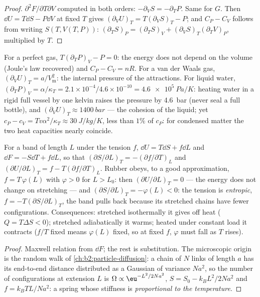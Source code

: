 \begin{proof}
$\partial^2F/\partial T\partial V$ computed in both orders: $-\partial_VS =
-\partial_TP$. Same for $G$. Then $\dd U = T\dd S - P\dd V$ at fixed $T$
gives $(\partial_VU)_T = T(\partial_VS)_T - P$; and $C_P - C_V$ follows
from writing $S(T,V(T,P))$: $(\partial_TS)_P = (\partial_TS)_V +
(\partial_VS)_T(\partial_TV)_P$, multiplied by $T$.
\end{proof}

\begin{example}\label{ex:b2:thermodynamic-potentials:reveal}
For a perfect gas, $T(\partial_TP)_V - P = 0$: the energy does not depend
on the volume (Joule's law recovered) and $C_P - C_V = nR$. For a van
der Waals gas, $(\partial_VU)_T = a/V_{\text{m}}^2$: the internal pressure of
the attractions. For liquid water, $(\partial_TP)_V = \alpha/\kappa_T = 2.1
\times 10^{-4}/4.6 \times 10^{-10} = \qty{4.6e5}{Pa/K}$: heating water in a
rigid full vessel by one kelvin raises the pressure by \qty{4.6}{bar}
(never seal a full bottle), and $(\partial_VU)_T \approx \qty{1400}{bar}$ ---
the cohesion of the liquid; yet $c_P - c_V = Tv\alpha^2/\kappa_T \approx
\qty{30}{J/kg/K}$, less than $1\%$ of $c_P$: for condensed matter the two
heat capacities nearly coincide.
\end{example}

\begin{proposition}\label{prop:b2:thermodynamic-potentials:rubber}
For a band of length $L$ under the tension $f$, $\dd U = T\dd S + f\dd L$
and $\dd F = -S\dd T + f\dd L$, so that $(\partial S/\partial L)_T =
-(\partial f/\partial T)_L$ and $(\partial U/\partial L)_T = f - T(\partial f/
\partial T)_L$. Rubber obeys, to a good approximation, $f = T\,\varphi(L)$
with $\varphi > 0$ for $L > L_0$: then $(\partial U/\partial L)_T = 0$ --- the
energy does not change on stretching --- and $(\partial S/\partial L)_T =
-\varphi(L) < 0$: the tension is \emph{entropic}, $f = -T(\partial S/\partial
L)_T$, the band pulls back because its stretched chains have fewer
configurations. Consequences: stretched isothermally it gives off heat
($Q = T\Delta S < 0$); stretched adiabatically it warms; heated under
constant load it contracts ($f/T$ fixed means $\varphi(L)$ fixed, so at
fixed $f$, $\varphi$ must fall as $T$ rises).
\end{proposition}

\begin{proof}
Maxwell relation from $\dd F$; the rest is substitution. The
microscopic origin is the random walk of \cref{ch:b2:particle-diffusion}:
a chain of $N$ links of length $a$ has its end-to-end distance
distributed as a Gaussian of variance $Na^2$, so the number of
configurations at extension $L$ is $\Omega \propto \eu^{-L^2/2Na^2}$, $S = S_0 -
k_BL^2/2Na^2$ and $f = k_BTL/Na^2$: a spring whose stiffness is
\emph{proportional to the temperature}.
\end{proof}

